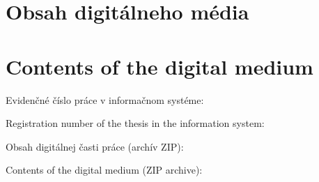 \thispagestyle{empty}

\ifx\FIITlagEN\undefined
\chapter{Obsah digitálneho média}
\else
\chapter{Contents of the digital medium}
\fi

\renewcommand*{\thepage}{C-\arabic{page}}

\ifx\FIITlagEN\undefined
\par Evidenčné číslo práce v informačnom systéme: \FIITevidenceNumber
\else
\par Registration number of the thesis in the information system: \FIITevidenceNumber
\fi

\ifx\FIITlagEN\undefined
\par Obsah digitálnej časti práce (archív ZIP):
\else
\par Contents of the digital medium (ZIP archive):
\fi

